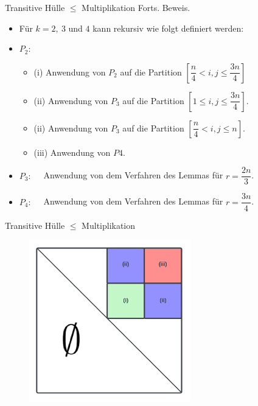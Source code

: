 \documentclass{beamer}
\begin{document}
	\begin{frame}{Transitive Hülle $\le$ Multiplikation}
		Forts. Beweis.
		\begin{itemize}
			\item Für $k = 2,\ 3$ und $4$ kann rekursiv wie folgt definiert werden:
			\item $P_2: \quad$
			\begin{itemize}
				\item (i) Anwendung von $P_2$ auf die Partition $[\dfrac{n}{4} < i, j\le \dfrac{3n}{4}]$
				\item (ii) Anwendung von $P_3$ auf die Partition $[1 \le i, j\le \dfrac{3n}{4}]$.
				\item (ii) Anwendung von $P_3$ auf die Partition $[\dfrac{n}{4} < i, j\le n]$.
				\item (iii) Anwendung von $P4$.
			\end{itemize}
			\pause
			\item $P_3:\quad$ Anwendung von dem Verfahren des Lemmas für $r = \dfrac{2n}{3}$.
			\pause
			\item $P_4: \quad$ Anwendung von dem Verfahren des Lemmas für $r = \dfrac{3n}{4}$.
		\end{itemize}
	\end{frame}

	\begin{frame}{Transitive Hülle $\le$ Multiplikation}
		\begin{figure}
			\centering
			\includegraphics[width=7cm,height=7cm]{img/LGV11}
		\end{figure}
	\end{frame}
\end{document}
